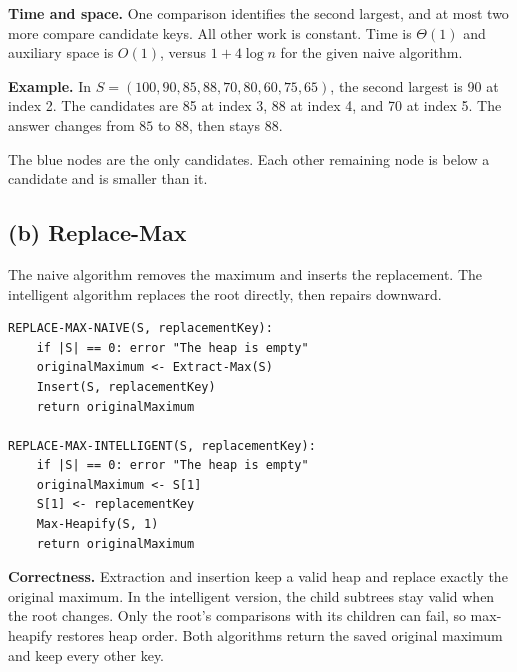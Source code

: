 \documentclass[11pt,a4paper]{article}
\newcommand{\parttitle}[1]{\Needspace{10\baselineskip}\subsection*{#1}}
\begin{document}
\textbf{Time and space.} One comparison identifies the second largest, and at most two more compare candidate keys. All other work is constant. Time is $\boxed{\Theta(1)}$ and auxiliary space is $\boxed{O(1)}$, versus $1+4\log n$ for the given naive algorithm.

\textbf{Example.} In $S=(100,90,85,88,70,80,60,75,65)$, the second largest is 90 at index 2. The candidates are 85 at index 3, 88 at index 4, and 70 at index 5. The answer changes from $85$ to $88$, then stays $88$.
\begin{center}
\end{center}
The blue nodes are the only candidates. Each other remaining node is below a candidate and is smaller than it.

\parttitle{(b) Replace-Max}
The naive algorithm removes the maximum and inserts the replacement. The intelligent algorithm replaces the root directly, then repairs downward.
\begin{lstlisting}
REPLACE-MAX-NAIVE(S, replacementKey):
    if |S| == 0: error "The heap is empty"
    originalMaximum <- Extract-Max(S)
    Insert(S, replacementKey)
    return originalMaximum

REPLACE-MAX-INTELLIGENT(S, replacementKey):
    if |S| == 0: error "The heap is empty"
    originalMaximum <- S[1]
    S[1] <- replacementKey
    Max-Heapify(S, 1)
    return originalMaximum
\end{lstlisting}
\textbf{Correctness.} Extraction and insertion keep a valid heap and replace exactly the original maximum. In the intelligent version, the child subtrees stay valid when the root changes. Only the root's comparisons with its children can fail, so max-heapify restores heap order. Both algorithms return the saved original maximum and keep every other key.
\end{document}

